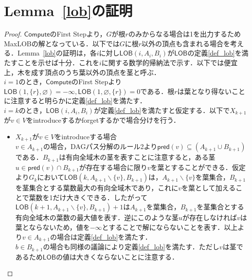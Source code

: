 \documentclass[master]{kuisthesis}		%
\theoremstyle{plain}
\theoremstyle{definition}
\begin{document}
{\section{Lemma~\ref{lob}の証明}
   
\begin{proof}
    $\mathsf{Compute}$のFirst Stepより，$G$が根$r$のみからなる場合は1を出力するためMaxLOBの解となっている．以下では$G$に根$r$以外の頂点も含まれる場合を考える．Lemma~\ref{lob}の証明は，各$i$に対し$\mathsf{LOB}(i, A_i, B_i)$が$\mathsf{LOB}$の定義\ref{def_lob}を満たすことを示せば十分．これを$i$に関する数学的帰納法で示す．以下では便宜上，木を成す頂点のうち葉以外の頂点を茎と呼ぶ．\\
    $i=1$のとき，$\mathsf{Compute}$のFirst Stepより$\mathsf{LOB}(1, \{r\}, \varnothing) = -\infty, \mathsf{LOB}(1, \varnothing, \{r\}) = 0$である．根$r$は葉となり得ないことに注意すると明らかに定義\ref{def_lob}を満たす．\\
    $i=k$のとき，$\mathsf{LOB}(i, A_i, B_i)$が定義\ref{def_lob}を満たすと仮定する．以下で$X_{k+1}$が$v \in V$をintroduceするかforgetするかで場合分けを行う．
    \begin{itemize}
        \item $X_{k+1}$が$v \in V$をintroduceする場合 \\
        $v \in A_{k+1}$の場合，DAGパス分解のルール2より$\mathsf{pred}(v) \subseteq (A_{k+1} \cup B_{k+1})$である．$B_{k+1}$は有向全域木の茎を表すことに注意すると，ある茎$u \in \mathsf{pred}(v) \cap B_{k+1}$が存在する場合に限り$v$を葉とすることができる．仮定より$G_k$において$\mathsf{LOB}(k, A_{k+1} \backslash \{v\}, B_{k+1})$は，$A_{k+1} \backslash \{v\}$を葉集合，$B_{k+1}$を茎集合とする葉数最大の有向全域木であり，これに$v$を葉として加えることで葉数を1だけ大きくできる．したがって$\mathsf{LOB}(k+1, A_{k+1} \backslash \{v\}, B_{k+1})+1$は$A_{k+1}$を葉集合，$B_{k+1}$を茎集合とする有向全域木の葉数の最大値を表す．逆にこのような茎$u$が存在しなければ$v$は葉とならないため，値を$-\infty$とすることで解にならないことを表す．以上より$v \in A_{k+1}$の場合は定義\ref{def_lob}を満たす．\\
        $b \in B_{k+1}$の場合も同様の議論により定義\ref{def_lob}を満たす．ただし$v$は茎であるため$\mathsf{LOB}$の値は大きくならないことに注意する．


\end{itemize}
\end{proof}}
\end{document}
